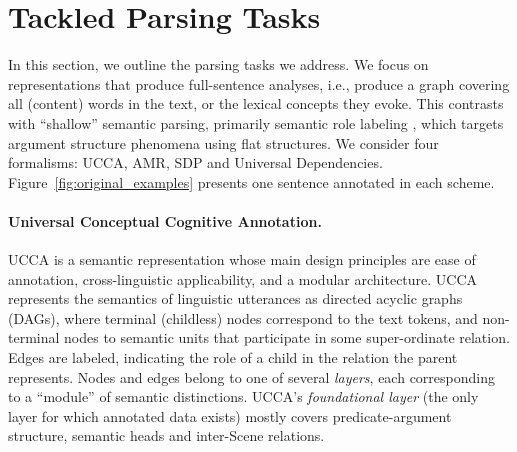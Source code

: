 \documentclass[11pt,a4paper]{article}
\newcommand{\oa}[1]{\footnote{\color{red}OA: #1}}
\begin{document}
\section{Tackled Parsing Tasks}\label{sec:tasks}

In this section, we outline the parsing tasks we address.
We focus on representations that produce full-sentence analyses,
i.e., produce a graph covering all (content) words in the text, 
or the lexical concepts they evoke.
This contrasts with ``shallow'' semantic parsing,
primarily semantic role labeling
\cite[SRL;][]{gildea2002automatic,Palmer:05,swayamdipta2017frame},
which targets argument structure phenomena using flat structures.
We consider four formalisms: UCCA, AMR, SDP and Universal Dependencies.
Figure~\ref{fig:original_examples} presents one sentence annotated in each scheme.


\paragraph{Universal Conceptual Cognitive Annotation.}\label{sec:ucca}
UCCA \cite{abend2013universal} is a semantic representation whose main design principles
are ease of annotation, cross-linguistic applicability, and a modular architecture.
UCCA represents the semantics of linguistic utterances
as directed acyclic graphs (DAGs), where terminal (childless) nodes
correspond to the text tokens, and non-terminal nodes to semantic units that participate
in some super-ordinate relation.
Edges are labeled, indicating the role of a child in the relation the parent represents.
Nodes and edges belong to one of several \textit{layers}, each corresponding
to a ``module'' of semantic distinctions.
UCCA's \textit{foundational layer} (the only layer for which annotated data exists)
mostly covers predicate-argument structure, semantic heads and inter-Scene relations.
\end{document}
